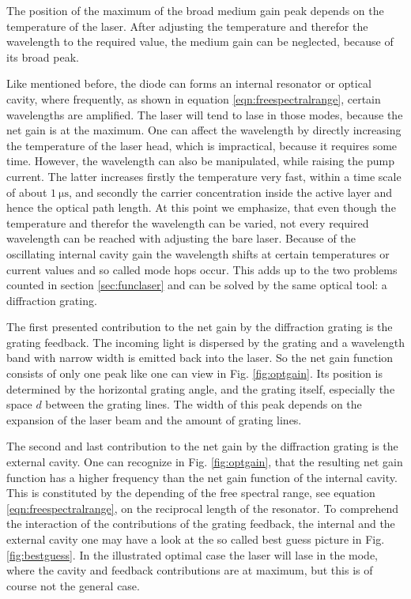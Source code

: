 The position of the maximum of the broad medium gain peak depends on the temperature of the laser.
After adjusting the temperature and therefor the wavelength to the required value, the medium gain can be neglected, because
of its broad peak.

Like mentioned before, the diode can forms an internal resonator or optical cavity, where frequently, as shown in equation
\eqref{eqn:freespectralrange}, certain wavelengths are amplified. The laser will tend to lase in those modes,
because the net gain is at the maximum. One can affect the wavelength by directly increasing the temperature of the
laser head, which is impractical, because it requires some time. However, the wavelength can also be manipulated, while
raising the pump current. The latter increases firstly the temperature very fast, within a time scale of about $\SI{1}{\micro\second}$,
and secondly the carrier concentration inside the active layer and hence the optical path length.
At this point we emphasize, that even though the temperature and therefor the wavelength can be varied, not every required
wavelength can be reached with adjusting the bare laser. Because of the oscillating internal cavity gain the wavelength shifts at
certain temperatures or current values and so called mode hops occur. This adds up to the two problems counted in section
\ref{sec:funclaser} and can be solved by the same optical tool: a diffraction grating.

The first presented contribution to the net gain by the diffraction grating is the grating feedback. The incoming light
is dispersed by the grating and a wavelength band with narrow width is emitted back into the laser. So the net gain
function consists of only one peak like one can view in Fig. \ref{fig:optgain}. Its position is determined by the horizontal grating angle,
and the grating itself, especially the space $d$ between the grating lines. The width of this peak depends on the
expansion of the laser beam and the amount of grating lines.

The second and last contribution to the net gain by the diffraction grating is the external cavity. One can recognize in Fig. \ref{fig:optgain},
that the resulting net gain function has a higher frequency than the net gain function of the internal cavity. This is constituted by
the depending of the free spectral range, see equation \eqref{eqn:freespectralrange}, on the reciprocal length of the resonator.
To comprehend the interaction of the contributions of the grating feedback, the internal and the external cavity one may have a
look at the so called best guess picture in Fig. \ref{fig:bestguess}. In the illustrated optimal case the laser will lase in the mode, where
the cavity and feedback contributions are at maximum, but this is of course not the general case.

